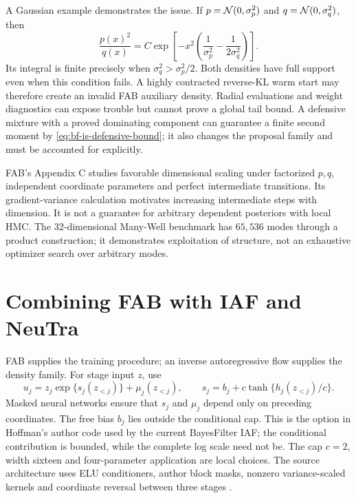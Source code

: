 A Gaussian example demonstrates the issue. If $p=\mathcal{N}(0,\sigma_p^2)$ and
$q=\mathcal{N}(0,\sigma_q^2)$, then
\begin{equation}
 \frac{p(x)^2}{q(x)}=C\exp\left[-x^2
 \left(\frac{1}{\sigma_p^2}-\frac{1}{2\sigma_q^2}\right)\right].
 \label{eq:bf-fab-gaussian-tail}
\end{equation}
Its integral is finite precisely when $\sigma_q^2>\sigma_p^2/2$. Both densities
have full support even when this condition fails. A highly contracted
reverse-KL warm start may therefore create an invalid FAB auxiliary density.
Radial evaluations and weight diagnostics can expose trouble but cannot prove
a global tail bound. A defensive mixture with a proved dominating component
can guarantee a finite second moment by \eqref{eq:bf-is-defensive-bound}; it
also changes the proposal family and must be accounted for explicitly.

FAB's Appendix C studies favorable dimensional scaling under factorized
$p,q$, independent coordinate parameters and perfect intermediate transitions.
Its gradient-variance calculation motivates increasing intermediate steps with
dimension. It is not a guarantee for arbitrary dependent posteriors with local
HMC. The 32-dimensional Many-Well benchmark has $65{,}536$ modes through a
product construction; it demonstrates exploitation of structure, not an
exhaustive optimizer search over arbitrary modes.



\section{Combining FAB with IAF and NeuTra}
\label{sec:bf-fab-iaf}

FAB supplies the training procedure; an inverse autoregressive flow supplies
the density family. For stage input $z$, use
\begin{equation}
 u_j=z_j\exp\{s_j(z_{<j})\}+\mu_j(z_{<j}),\qquad
 s_j=b_j+c\tanh\{h_j(z_{<j})/c\}.
 \label{eq:bf-fab-iaf-stage}
\end{equation}
Masked neural networks ensure that $s_j$ and $\mu_j$ depend only on preceding
coordinates. The free bias $b_j$ lies outside the conditional cap. This is the
option in Hoffman's author code used by the current BayesFilter IAF; the
conditional contribution is bounded, while the complete log scale need not be.
The cap $c=2$, width sixteen and four-parameter application are local choices.
The source architecture uses ELU conditioners, author block masks, nonzero
variance-scaled kernels and coordinate reversal between three stages
\citep[Section 4.1.1 and accompanying code]{hoffman2019neutra}.


